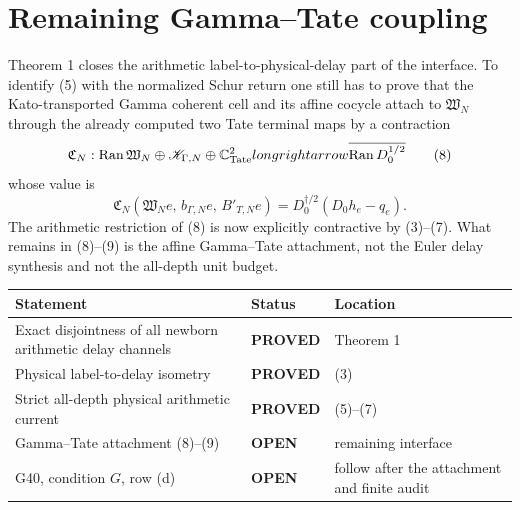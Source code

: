 \documentclass[11pt]{article}
\newcommand{\PROVED}{\textcolor{green!40!black}{\textbf{PROVED}}}
\newcommand{\OPEN}{\textcolor{red!70!black}{\textbf{OPEN}}}
\begin{document}
\section{Remaining Gamma--Tate coupling}

Theorem 1 closes the arithmetic label-to-physical-delay part of the
interface.  To identify (5) with the normalized Schur return one still has
to prove that the Kato-transported Gamma coherent cell and its affine
cocycle attach to $\mathfrak W_N$ through the already computed two Tate
terminal maps by a contraction
\begin{equation}
 \mathfrak C_N:
 \operatorname{Ran}\mathfrak W_N\oplus\mathscr K_{\Gamma,N}
 \oplus\mathbb C^2_{\rm Tate}longrightarrow
 \overline{\operatorname{Ran}D_0^{1/2}}                       \tag{8}
\end{equation}
whose value is
\begin{equation}
 \mathfrak C_N(\mathfrak W_Ne,\,b_{\Gamma,N}e,\,B'_{T,N}e)
 =D_0^{\dagger/2}(D_0h_e-q_e).                                \tag{9}
\end{equation}
The arithmetic restriction of (8) is now explicitly contractive by
(3)--(7).  What remains in (8)--(9) is the affine Gamma--Tate attachment,
not the Euler delay synthesis and not the all-depth unit budget.

\begin{center}
\begin{tabular}{>{\raggedright\arraybackslash}p{.55\linewidth}
                >{\centering\arraybackslash}p{.15\linewidth}
                >{\raggedright\arraybackslash}p{.20\linewidth}}
\toprule
Statement & Status & Location \\
\midrule
Exact disjointness of all newborn arithmetic delay channels & \PROVED & Theorem 1 \\
Physical label-to-delay isometry & \PROVED & (3) \\
Strict all-depth physical arithmetic current & \PROVED & (5)--(7) \\
Gamma--Tate attachment (8)--(9) & \OPEN & remaining interface \\
G40, condition $G$, row (d) & \OPEN & follow after the attachment and finite audit \\
\bottomrule
\end{tabular}
\end{center}
\end{document}
